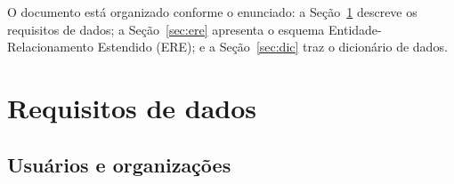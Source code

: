 \documentclass[11pt,a4paper]{article}
\begin{document}
O documento está organizado conforme o enunciado: a Seção~\ref{sec:req}
descreve os requisitos de dados; a Seção~\ref{sec:ere} apresenta o esquema
Entidade-Relacionamento Estendido (ERE); e a Seção~\ref{sec:dic} traz o
dicionário de dados.

\section{Requisitos de dados}\label{sec:req}

\subsection{Usuários e organizações}
\end{document}
